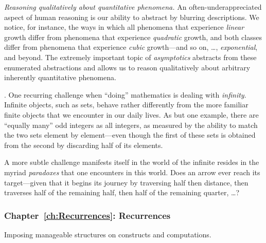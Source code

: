 {\em Reasoning qualitatively about quantitative phenomena.}
%
An often-underappreciated aspect of human reasoning is our ability to
abstract by blurring descriptions.  We notice, for instance, the ways
in which all phenomena that experience {\em linear} growth differ from
phenomena that experience {\em quadratic} growth, and both classes
differ from phenomena that experience {\em cubic} growth---and so on,
\ldots, {\em exponential}, and beyond.  
The extremely important topic of {\it asymptotics} abstracts from these
enumerated abstractions and allows us to reason qualitatively about
arbitrary inherently quantitative phenomena.

\medskip

.
One recurring challenge when ``doing'' mathematics is dealing with
{\em infinity}.  Infinite objects, such as sets, behave rather
differently from the more familiar finite objects that we encounter in
our daily lives.  As but one example, there are ``equally many'' odd
integers as all integers, as measured by the ability to match the two
sets element by element---even though the first of these sets is
obtained from the second by discarding half of its elements.

A more subtle challenge manifests itself in the world of the infinite
resides in the myriad {\em paradoxes} that one encounters in this
world.  Does an arrow ever reach its target---given that it begins its
journey by traversing half then distance, then traverses half of the
remaining half, then half of the remaining quarter, \ldots?



\subsubsection{Chapter~\ref{ch:Recurrences}: Recurrences}

Imposing manageable structures on constructs and computations.

